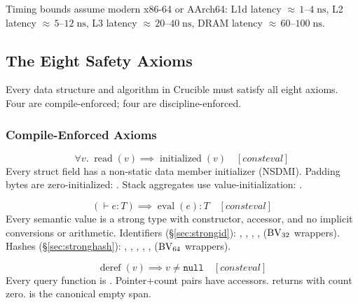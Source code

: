Timing bounds assume modern x86-64 or AArch64:
L1d latency ${\approx}\,1$--$4\;\text{ns}$,
L2 latency ${\approx}\,5$--$12\;\text{ns}$,
L3 latency ${\approx}\,20$--$40\;\text{ns}$,
DRAM latency ${\approx}\,60$--$100\;\text{ns}$.

\subsection{The Eight Safety Axioms}
\label{sec:safety-axioms}

Every data structure and algorithm in Crucible must satisfy all eight
axioms.  Four are compile-enforced; four are discipline-enforced.

\subsubsection{Compile-Enforced Axioms}

\begin{definition}[InitSafe]
\label{def:initsafe}
\[
  \forall v.\; \operatorname{read}(v) \implies \operatorname{initialized}(v)
  \quad [\textit{consteval}]
\]
Every struct field has a non-static data member initializer (NSDMI).
Padding bytes are zero-initialized: .
Stack aggregates use value-initialization: .
\end{definition}

\begin{definition}[TypeSafe]
\label{def:typesafe}
\[
  (\vdash e : T) \implies \operatorname{eval}(e) : T
  \quad [\textit{consteval}]
\]
Every semantic value is a strong type with  constructor,
 accessor, and no implicit conversions or arithmetic.
Identifiers (\S\ref{sec:strongid}): , , ,
,  ($\mathrm{BV}_{32}$ wrappers).
Hashes (\S\ref{sec:stronghash}): , ,
, , ,
 ($\mathrm{BV}_{64}$ wrappers).
\end{definition}

\begin{definition}[NullSafe]
\label{def:nullsafe}
\[
  \operatorname{deref}(v) \implies v \neq \mathtt{null}
  \quad [\textit{consteval}]
\]
Every query function is \code{[[nodiscard]]}.
Pointer+count pairs have  accessors.
 returns  with count zero.
 is the canonical empty span.
\end{definition}

